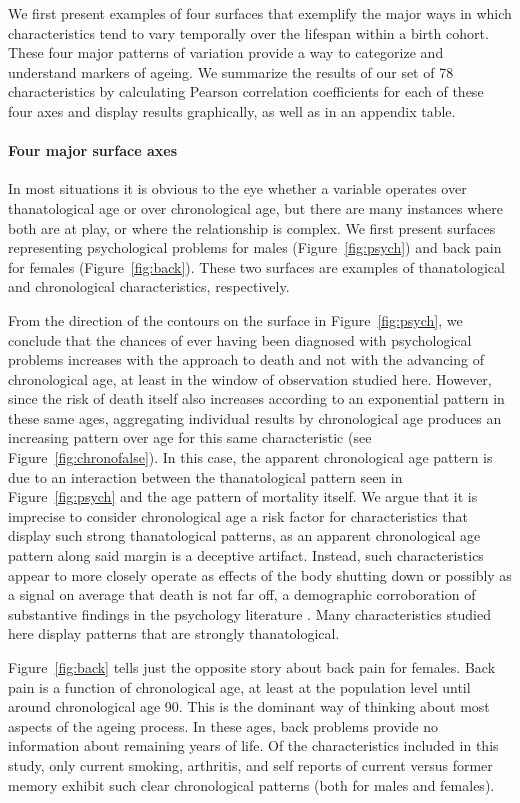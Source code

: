 \documentclass[11pt,oneside]{article} %
\begin{document}
We first present examples of four surfaces that exemplify the major ways in
which characteristics tend to vary temporally over the lifespan within a birth
cohort. These four major patterns of variation provide a way to categorize and
understand markers of ageing. We summarize the results of our set of 78
characteristics by calculating Pearson correlation coefficients for each of
these four axes and display results graphically, as well as in an appendix
table.

\paragraph{Four major surface axes}
In most situations it is obvious to the eye whether a
variable operates over thanatological age or over chronological age, but there
are many instances where both are at play, or where the relationship is
complex. We first present surfaces representing psychological problems for males
(Figure~\ref{fig:psych}) and back pain for females (Figure~\ref{fig:back}).
These two surfaces are examples of thanatological and
chronological characteristics, respectively.

From the direction of the contours on the surface in Figure~\ref{fig:psych}, we
conclude that the chances of ever having been diagnosed with psychological
problems increases with the approach to death and not with the advancing of
chronological age, at least in the window of observation studied here.
However, since the risk of death itself also increases according to an
exponential pattern in these same ages, aggregating individual results by
chronological age produces an increasing pattern over age for this same
characteristic (see Figure~\ref{fig:chronofalse}).
In this case, the apparent chronological age pattern is due
to an interaction between the thanatological pattern seen in
Figure~\ref{fig:psych} and the age pattern of mortality itself. We argue that it
is imprecise to consider chronological age a risk factor for characteristics that display such strong thanatological patterns, as an
apparent chronological age pattern along said margin is a deceptive artifact.
Instead, such characteristics appear to more closely operate as effects of the
body shutting down or possibly as a signal on average that death is not far off,
a demographic corroboration of substantive findings in the psychology literature
\citep{carstensen2006influence}. Many characteristics studied
here display patterns that are strongly thanatological.

Figure~\ref{fig:back} tells just the opposite story about back pain for females.
Back pain is a function of
chronological age, at least at the population level until around chronological
age 90. This is the dominant way of thinking about most aspects of the ageing
process. In these ages, back problems provide no information about remaining
years of life. Of the characteristics included in this
study, only current smoking, arthritis, and self reports of current versus former memory exhibit such clear chronological patterns (both for males and
females).
\end{document}
